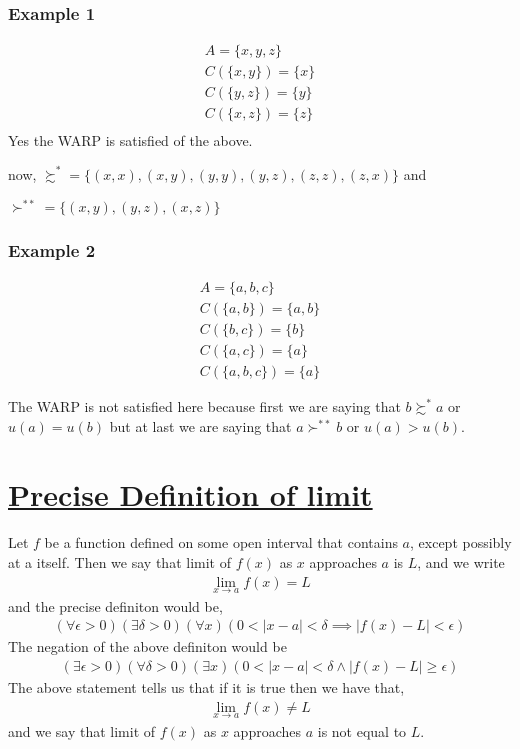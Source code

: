 \documentclass[12pt,a4paper,fleqn]{article}
\begin{document}
 \subsubsection*{Example 1} 
 \begin{align*}
    A= \{x,y,z\} \\
    C(\{x,y\})=\{x\} \\
    C(\{y,z\})=\{y\} \\
    C(\{x,z\})=\{z\} \\ 
\end{align*}
Yes the WARP is satisfied of the above.

now, \(\succsim^* =\{(x,x),(x,y),(y,y),(y,z),(z,z),(z,x)\} \)  and

\(\succ^{**} = \{(x,y),(y,z),(x,z)\} \)  

 \subsubsection*{Example 2} 

 \begin{align*}
  A= \{a,b,c\} \\
  C(\{a,b\})=\{a,b\} \\
  C(\{b,c\})=\{b\} \\
  C(\{a,c\})=\{a\} \\ 
  C(\{a,b,c\})=\{a\}
\end{align*}

The WARP is not satisfied here because first we are saying that \(b \succsim^* a\) or \(u(a)=u(b)\)  but at last we are saying that \(a \succ^{**} b\) or \(u(a) > u(b)\).

\section*{ \underline{Precise Definition of limit} } 
   Let \(f\) be a function defined on some open interval that contains \(a\), except possibly at a itself. Then we say that limit of \(f(x)\) as \(x\) approaches \(a \)  is \(L\), and we write 
    \begin{align*}
        \lim_{x \to a} f(x) = L 
   \end{align*}    
and the precise definiton would be, 
 \begin{align*}
    \left( \forall \epsilon > 0 \right) \left( \exists \delta > 0 \right)\left( \forall x \right) \left( 0 < |x-a|< \delta \implies |f(x)-L|< \epsilon \right)   
\end{align*}
The negation of the above definiton would be 
 \begin{align*}
    \left( \exists \epsilon > 0 \right) \left( \forall \delta > 0 \right)\left( \exists x \right) \left( 0< |x-a| < \delta \wedge |f(x)-L| \geq \epsilon \right)  
\end{align*}
The above statement tells us that if it is true then we have that,
 \begin{align*}
    \lim_{x \to a} f(x) \neq L
\end{align*}
and we say that limit of \(f(x)\) as \(x\) approaches \(a \)  is  not equal to \(L\).
\end{document}
